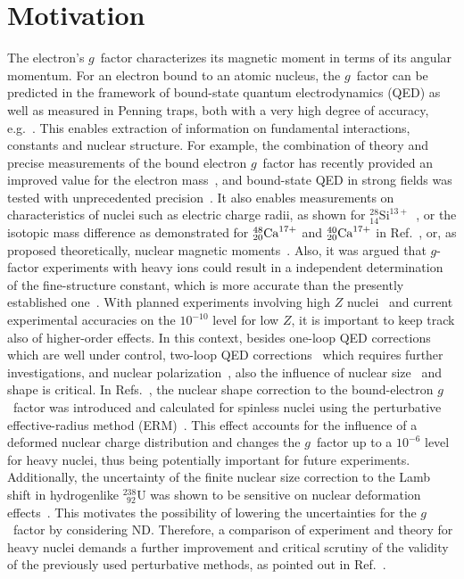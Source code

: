 \section{Motivation}
\label{sec:gfac_motiv}
The electron's $g$~factor characterizes its magnetic moment in terms of its angular momentum. For an electron bound to an atomic nucleus, the $g$~factor can be predicted in the framework of bound-state quantum electrodynamics (QED) as well as measured in Penning traps, both with a very high degree of accuracy, e.g.~\cite{Sturm2014,Sturm2011}. This enables extraction of information on fundamental interactions, constants and nuclear structure. For example, the combination of theory and precise measurements of the bound electron $g$~factor has recently provided an improved value for the electron mass~\cite{Sturm2014}, and bound-state QED in strong fields was tested with unprecedented precision~\cite{Haffner2000, Verdu2004, Kohler2015, Zatorski2017}. It also enables measurements on characteristics of nuclei such as electric charge radii, as shown for $^{28}_{14}\textrm{Si}^{13+}$~\cite{Sturm2011}, or the isotopic mass difference as demonstrated for $\null^{48}_{20} \textrm{Ca}^{17+}$ and $\null^{40}_{20} \textrm{Ca}^{17+}$ in Ref.~\cite{Kohler2016}, or, as proposed theoretically, nuclear magnetic moments~\cite{Yerokhin2011}.  Also, it was argued that $g$-factor experiments with heavy ions could result in a independent determination of the fine-structure constant, which is more accurate than the presently established one~\cite{Shabaev2006,yerokhin2016}.
With planned experiments involving high $Z$ nuclei~\cite{HITRAP2008,vogel2015,sturm2017} and current experimental accuracies on the $10^{-10}$ level for low $Z$, it is important to keep track also of higher-order effects. 
In this context, besides one-loop QED corrections~\cite{Yerokhin2004,yerokhin2017} which are well under control, two-loop QED corrections~\cite{Pachucki2005,yerokhin2013,czarnecki2016,czarnecki2018} which requires further investigations, and nuclear polarization~\cite{Nefiodov,volotka2014}, also the influence of nuclear size~\cite{karshenboim2000,Glazov2002} and shape is critical.
In Refs.~\cite{jacek2012, ZatorskiWorkingNotes}, the nuclear shape correction to the bound-electron $g$~factor was introduced and calculated for spinless nuclei using the perturbative effective-radius method (ERM)~\cite{Shabaev1993,kozhedub2008}. This effect accounts for the influence of a deformed nuclear charge distribution and changes the $g$~factor up to a $10^{-6}$ level for heavy nuclei, thus being potentially important for future experiments.
Additionally, the uncertainty of the finite nuclear size correction to the Lamb shift in hydrogenlike $^{238}_{\;\,92}$U was shown to be sensitive on nuclear deformation effects~\cite{kozhedub2008}.
This motivates the possibility of lowering the uncertainties for the $g$~factor by considering ND.
Therefore, a comparison of experiment and theory for heavy nuclei demands a further improvement and critical scrutiny of the validity of the previously used perturbative methods, as pointed out in Ref.~\cite{karshenboim2018}.

